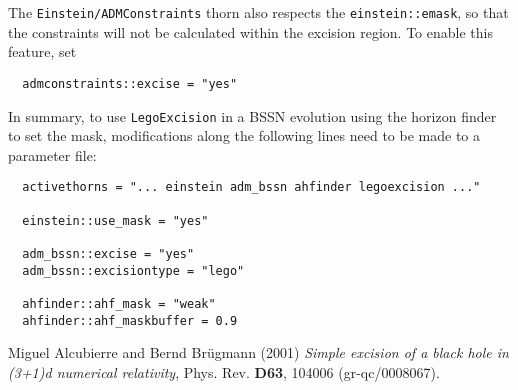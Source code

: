 \documentclass{article}
\begin{document}
The \texttt{Einstein/ADMConstraints} thorn also respects the
\texttt{einstein::emask}, so that the constraints will not be
calculated within the excision region. To enable this feature,
set
\begin{verbatim}
  admconstraints::excise = "yes"
\end{verbatim}
\vspace{\baselineskip}

In summary, to use \texttt{LegoExcision} in a BSSN evolution using the
horizon finder to set the mask, modifications along the following
lines need to be made to a parameter file:
\begin{verbatim}
  activethorns = "... einstein adm_bssn ahfinder legoexcision ..."

  einstein::use_mask = "yes"

  adm_bssn::excise = "yes"
  adm_bssn::excisiontype = "lego"

  ahfinder::ahf_mask = "weak"
  ahfinder::ahf_maskbuffer = 0.9
\end{verbatim}

\begin{thebibliography}{9}
    Miguel Alcubierre and Bernd Br\"ugmann (2001)
    \emph{Simple excision of a black hole in (3+1)d numerical
    relativity},
    Phys. Rev. \textbf{D63}, 104006 (gr-qc/0008067).
\end{thebibliography}


\end{document}
